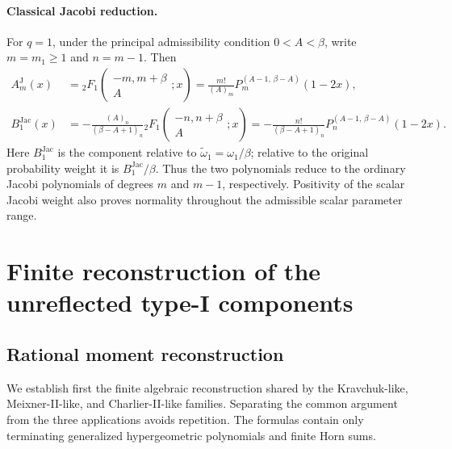 \documentclass[10pt]{amsart}
\newcommand{\pFq}[5]{{}_{#1}F_{#2}\!\left(\begin{matrix}#3\\#4\end{matrix};#5\right)}
\theoremstyle{plain}
\theoremstyle{definition}
\theoremstyle{remark}
\begin{document}
\paragraph{Classical Jacobi reduction.}
For \(q=1\), under the principal admissibility condition \(0<A<\beta\),
write \(m=m_1\ge1\) and \(n=m-1\). Then
\begin{align}
 A_m^{\mathrm J}(x)
 &=\pFq{2}{1}{-m,m+\beta}{A}{x}
 =\frac{m!}{(A)_m}
 P_m^{(A-1,\,\beta-A)}(1-2x),
 \label{eq:q1-Jacobi-A}\\
 B_1^{\mathrm{Jac}}(x)
 &=-\frac{(A)_n}{(\beta-A+1)_n}
 \pFq{2}{1}{-n,n+\beta}{A}{x}
 =-\frac{n!}{(\beta-A+1)_n}
 P_n^{(A-1,\,\beta-A)}(1-2x).
 \label{eq:q1-Jacobi-B}
\end{align}
Here \(B_1^{\mathrm{Jac}}\) is the component relative to
\(\widetilde\omega_1=\omega_1/\beta\); relative to the original
probability weight it is \(B_1^{\mathrm{Jac}}/\beta\). Thus the two
polynomials reduce to the ordinary Jacobi polynomials of degrees \(m\) and
\(m-1\), respectively. Positivity of the scalar Jacobi weight also proves
normality throughout the admissible scalar parameter range.

\section{Finite reconstruction of the unreflected type-I components}
\label{sec:explicit-unreflected-B}

\subsection{Rational moment reconstruction}
\label{subsec:unreflected-rational-reconstruction}

We establish first the finite algebraic reconstruction shared by the
Kravchuk-like, Meixner-II-like, and Charlier-II-like families.  Separating
the common argument from the three applications avoids repetition.  The formulas
contain only terminating generalized hypergeometric polynomials and finite
Horn sums.
\end{document}
